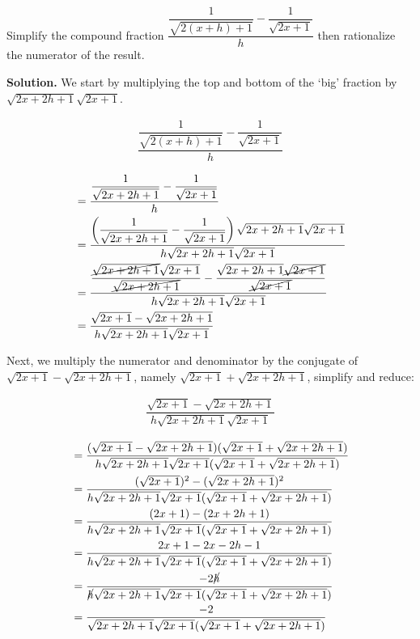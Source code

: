 \begin{ex} \label{rationalizenumdenombosslevel}

Simplify the compound fraction $\dfrac{\dfrac{1}{\sqrt{2(x+h)+1}} - \dfrac{1}{\sqrt{2x+1}}}{h}$ then rationalize the numerator of the result.

\medskip

{\bf Solution.} We start by multiplying the top and bottom of the `big' fraction by $\sqrt{2x+2h+1} \sqrt{2x+1}$.

\begin{multline*}
\dfrac{\dfrac{1}{\sqrt{2(x+h)+1}} - \dfrac{1}{\sqrt{2x+1}}}{h} \\
\end{multline*}
\begin{align*}
& = \dfrac{\dfrac{1}{\sqrt{2x+2h+1}} - \dfrac{1}{\sqrt{2x+1}}}{h}\\
& = \dfrac{\left(\dfrac{1}{\sqrt{2x+2h+1}} - \dfrac{1}{\sqrt{2x+1}}\right) \sqrt{2x+2h+1} \sqrt{2x+1}}{h\sqrt{2x+2h+1} \sqrt{2x+1}}\\
& = \dfrac{\dfrac{\cancel{\sqrt{2x+2h+1}}\sqrt{2x+1}}{\cancel{\sqrt{2x+2h+1}}} - \dfrac{\sqrt{2x+2h+1} \cancel{\sqrt{2x+1}}}{\cancel{\sqrt{2x+1}}}}{h\sqrt{2x+2h+1} \sqrt{2x+1}}\\
& = \dfrac{\sqrt{2x + 1}- \sqrt{2x+2h+1}}{h\sqrt{2x+2h+1} \sqrt{2x+1}}\\	
\end{align*}
																															
Next, we multiply the numerator and denominator by the conjugate of $\sqrt{2x+1} - \sqrt{2x+2h+1}$, namely $\sqrt{2x+1} + \sqrt{2x+2h+1}$, simplify and reduce:

\begin{multline*}
\dfrac{\sqrt{2x + 1}- \sqrt{2x+2h+1}}{h\sqrt{2x+2h+1} \sqrt{2x+1}} \\
\end{multline*}
\begin{align*}
& = \dfrac{(\sqrt{2x+1} - \sqrt{2x+2h+1})(\sqrt{2x+1} + \sqrt{2x+2h+1})}{h\sqrt{2x+2h+1} \sqrt{2x+1}(\sqrt{2x+1} + \sqrt{2x+2h+1})} \\ 
& = \dfrac{(\sqrt{2x+1})^2 - (\sqrt{2x+2h+1})^2}{h\sqrt{2x+2h+1} \sqrt{2x+1}(\sqrt{2x+1} + \sqrt{2x+2h+1})} \\
& = \dfrac{(2x+1) - (2x+2h+1)}{h\sqrt{2x+2h+1} \sqrt{2x+1}(\sqrt{2x+1} + \sqrt{2x+2h+1})} \\
& = \dfrac{2x+1 -2x-2h-1}{h\sqrt{2x+2h+1} \sqrt{2x+1}(\sqrt{2x+1} + \sqrt{2x+2h+1})} \\
& = \dfrac{-2\cancel{h}}{\cancel{h}\sqrt{2x+2h+1} \sqrt{2x+1}(\sqrt{2x+1} + \sqrt{2x+2h+1})} \\
& = \dfrac{-2}{\sqrt{2x+2h+1} \sqrt{2x+1}(\sqrt{2x+1} + \sqrt{2x+2h+1})} \\
\end{align*}


\end{ex}
